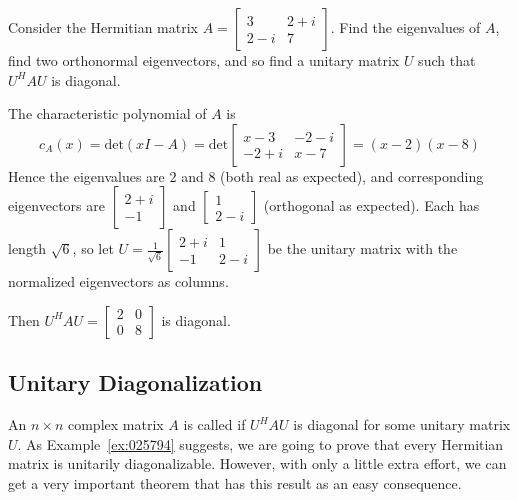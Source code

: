 \documentclass{ximera}
\begin{document}
\begin{example}\label{ex:025794}
Consider the Hermitian matrix $A = \left[ \begin{array}{cc}
3 & 2 + i \\
2 - i & 7
\end{array}\right]$. Find the eigenvalues of $A$, find two orthonormal eigenvectors, and so find a unitary matrix $U$ such that $U^{H}AU$ is diagonal.


\begin{explanation}
  The characteristic polynomial of $A$ is
\begin{equation*}
c_{A}(x) = \mbox{det}(xI - A) = \mbox{det}\left[ \begin{array}{rr}
x - 3 & -2 - i \\
-2 + i & x - 7
\end{array}\right] = (x-2)(x-8)
\end{equation*}
Hence the eigenvalues are $2$ and $8$ (both real as expected), and corresponding eigenvectors are $\left[ \begin{array}{cc}
2 + i \\
-1
\end{array}\right]$ and $\left[ \begin{array}{cc}
1 \\
2 - i
\end{array}\right]$ (orthogonal as expected). Each has length $\sqrt{6}$,
 so let $U = \frac{1}{\sqrt{6}}\left[ \begin{array}{cc}
 2 + i & 1 \\
 -1 & 2 - i
 \end{array}\right]$ be the unitary matrix with the normalized eigenvectors as columns.

Then $U^HAU = \left[ \begin{array}{rr}
2 & 0 \\
0 & 8
\end{array}\right]$ is diagonal.
\end{explanation}
\end{example}

\subsection*{Unitary Diagonalization}

An $n \times n$ complex matrix $A$ is called  if $U^{H}AU$ is diagonal for some unitary matrix $U$. As Example~\ref{ex:025794} suggests, we are going to prove that every Hermitian matrix is unitarily diagonalizable. However, with only a little extra effort, we can get a very important theorem that has this result as an easy consequence.
\end{document}
